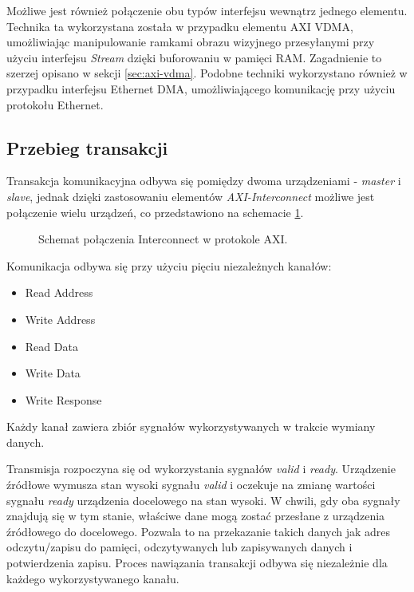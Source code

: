 Możliwe jest również połączenie obu typów interfejsu wewnątrz jednego elementu. Technika ta wykorzystana została w przypadku elementu AXI VDMA, umożliwiając manipulowanie ramkami obrazu wizyjnego przesyłanymi przy użyciu interfejsu \emph{Stream} dzięki buforowaniu w pamięci RAM. Zagadnienie to szerzej opisano w sekcji \ref{sec:axi-vdma}. Podobne techniki wykorzystano również w przypadku interfejsu Ethernet DMA, umożliwiającego komunikację przy użyciu protokołu Ethernet.

\subsection{Przebieg transakcji}

Transakcja komunikacyjna odbywa się pomiędzy dwoma urządzeniami - \emph{master} i \emph{slave}, jednak dzięki zastosowaniu elementów \emph{AXI-Interconnect} możliwe jest połączenie wielu urządzeń, co przedstawiono na schemacie \ref{fig:axi-interconnect}.

\begin{figure}[h]
	\centering
	\def\svgwidth{8cm}
	
	\caption{Schemat połączenia Interconnect w protokole AXI.}
	\label{fig:axi-interconnect}
\end{figure}


Komunikacja odbywa się przy użyciu pięciu niezależnych kanałów:
\begin{itemize}
	\item Read Address
	\item Write Address
	\item Read Data
	\item Write Data
	\item Write Response
\end{itemize}

Każdy kanał zawiera zbiór sygnałów wykorzystywanych w trakcie wymiany danych.

Transmisja rozpoczyna się od wykorzystania sygnałów \emph{valid} i \emph{ready}. Urządzenie źródłowe wymusza stan wysoki sygnału \emph{valid} i oczekuje na zmianę wartości sygnału \emph{ready} urządzenia docelowego na stan wysoki. W chwili, gdy oba sygnały znajdują się w tym stanie, właściwe dane mogą zostać przesłane z urządzenia źródłowego do docelowego. Pozwala to na przekazanie takich danych jak adres odczytu/zapisu do pamięci, odczytywanych lub zapisywanych danych i potwierdzenia zapisu. Proces nawiązania transakcji odbywa się niezależnie dla każdego wykorzystywanego kanału.

